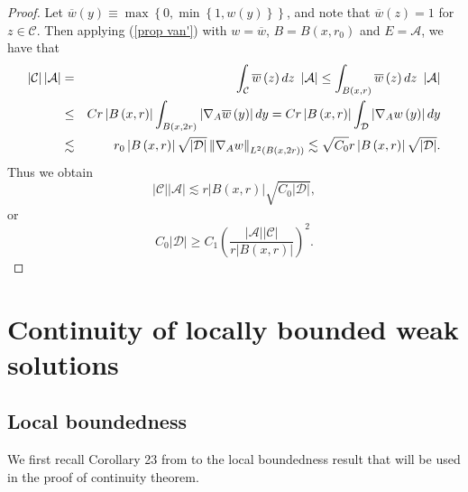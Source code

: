 \documentclass{amsart}
\theoremstyle{plain}
\numberwithin{equation}{section}
\begin{document}
\begin{proof}
	Let $\overline{w}\left( y\right) \equiv \max \left\{ 0,\min \left\{
	1,w\left( y\right) \right\} \right\} $, and note that $\overline{w}\left(
	z\right) =1$ for $z\in \mathcal{C}$. Then applying (\ref{prop van'}) with $w=%
	\overline{w}$, $B=B\left( x,r_{0}\right) $ and $E=\mathcal{A}$, we have that%
	\begin{eqnarray*}
		\left\vert \mathcal{C}\right\vert \left\vert \mathcal{A}\right\vert &=&\int_{%
			\mathcal{C}}\overline{w}\left( z\right) dz\ \left\vert \mathcal{A}%
		\right\vert \leq \int_{B\left( x,r\right) }\overline{w}\left( z\right) dz\
		\left\vert \mathcal{A}\right\vert \\
		&\leq &Cr\left\vert B\left( x,r\right) \right\vert \int_{B\left( x,2r\right)
		}\left\vert \nabla _{A}\overline{w}\left( y\right) \right\vert
		dy=Cr\left\vert B\left( x,r\right) \right\vert \int_{\mathcal{D}}\left\vert
		\nabla _{A}w\left( y\right) \right\vert dy \\
		&\lesssim &r_{0}\left\vert B\left( x,r\right) \right\vert \sqrt{\left\vert 
			\mathcal{D}\right\vert }\left\Vert \nabla _{A}w\right\Vert _{L^{2}\left(
			B\left( x,2r\right) \right) }\lesssim \sqrt{C_{0}}r\left\vert B\left(
		x,r\right) \right\vert \sqrt{\left\vert \mathcal{D}\right\vert }.
	\end{eqnarray*}%
	Thus we obtain%
	\begin{equation*}
	\left\vert \mathcal{C}\right\vert \left\vert \mathcal{A}\right\vert \lesssim
	r\left\vert B\left( x,r\right) \right\vert \sqrt{C_{0}\left\vert \mathcal{D}%
		\right\vert },
	\end{equation*}%
	or%
	\begin{equation*}
	C_{0}\left\vert \mathcal{D}\right\vert \geq C_{1}\left( \frac{\left\vert 
		\mathcal{A}\right\vert \left\vert \mathcal{C}\right\vert }{r\left\vert
		B\left( x,r\right) \right\vert }\right) ^{2}.
	\end{equation*}
\end{proof}

\section{Continuity of locally bounded weak solutions}

\subsection{Local boundedness}
We first recall Corollary 23 from \cite{KoRiSaSh2} to the local boundedness result that will be used in the proof of continuity theorem.
\end{document}
